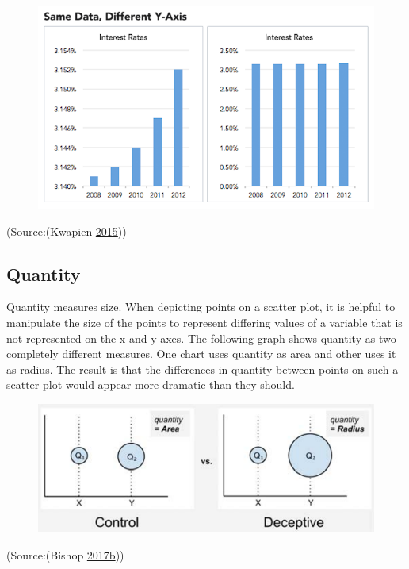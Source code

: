 \documentclass[]{book}
\theoremstyle{definition}
\theoremstyle{definition}
\theoremstyle{definition}
\theoremstyle{remark}
\begin{document}
\begin{figure}
\centering
\includegraphics{images/Size1.png}
\caption{}
\end{figure}

(Source:(Kwapien \protect\hyperlink{ref-misleading_data}{2015}))

\subsection{Quantity}\label{quantity}

Quantity measures size. When depicting points on a scatter plot, it is
helpful to manipulate the size of the points to represent differing
values of a variable that is not represented on the x and y axes. The
following graph shows quantity as two completely different measures. One
chart uses quantity as area and other uses it as radius. The result is
that the differences in quantity between points on such a scatter plot
would appear more dramatic than they should.

\begin{figure}
\centering
\includegraphics{images/Quantity1.png}
\caption{}
\end{figure}

(Source:(Bishop
\protect\hyperlink{ref-study_asks}{2017}\protect\hyperlink{ref-study_asks}{b}))
\end{document}
